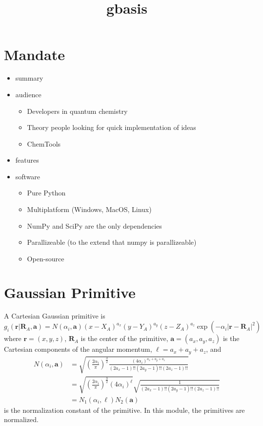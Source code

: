 \documentclass[letterpaper]{article}
\title{gbasis}
\begin{document}
\tableofcontents

\section{Mandate}
\begin{itemize}
\item summary
\item audience
  \begin{itemize}
  \item Developers in quantum chemistry
  \item Theory people looking for quick implementation of ideas
  \item ChemTools
  \end{itemize}
\item features
\item software
  \begin{itemize}
  \item Pure Python
  \item Multiplatform (Windows, MacOS, Linux)
  \item NumPy and SciPy are the only dependencies
  \item Parallizeable (to the extend that numpy is parallizeable)
  \item Open-source
  \end{itemize}
\end{itemize}

\section{Gaussian Primitive}
A Cartesian Gaussian primitive is
\begin{equation}
  \label{eq:cart_prim}
  g_i(\mathbf{r} | \mathbf{R}_A, \mathbf{a}) =
  N(\alpha_i, \mathbf{a})
  (x - X_A)^{a_x} (y - Y_A)^{a_y} (z - Z_A)^{a_z}
  \exp \left(-\alpha_i |\mathbf{r} - \mathbf{R}_A|^2 \right)
\end{equation}
where $\mathbf{r} = (x, y, z)$, $\mathbf{R}_A$ is the center of the primitive,
$\mathbf{a} = (a_x, a_y, a_z)$ is the Cartesian components of the angular
momentum, $\ell = a_x + a_y + a_z$, and
\begin{equation}
  \label{eq:cart_norm}
  \begin{split}
    N (\alpha_i, \mathbf{a}) &=
    \sqrt{
      \left(
        \frac{2 \alpha_i}{\pi}
      \right)^{\frac{3}{2}}
      \frac{(4 \alpha_i)^{a_x + a_y + a_z}}{(2 a_x -1)!! (2 a_y -1)!! (2 a_z -1)!!}
    }\\
    &= \sqrt{
      \left(
        \frac{2 \alpha_i}{\pi}
      \right)^{\frac{3}{2}}
      (4 \alpha_i)^{\ell}
    }
    \sqrt{\frac{1}{(2 a_x -1)!! (2 a_y -1)!! (2 a_z -1)!!}}\\
    &= N_1 (\alpha_i, \ell) N_2 (\mathbf{a})
  \end{split}
\end{equation}
is the normalization constant of the primitive.
In this module, the primitives are normalized.
\end{document}
